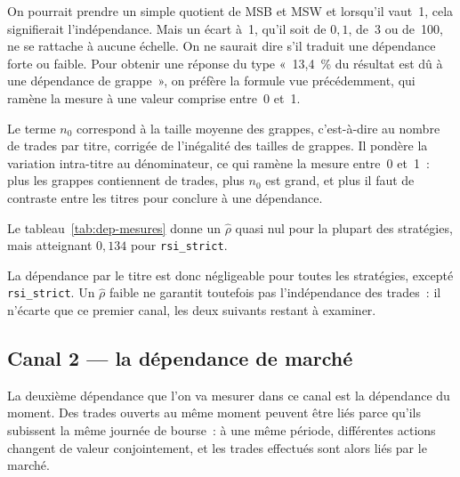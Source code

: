 On pourrait prendre un simple quotient de MSB et MSW et lorsqu'il vaut~1,
cela signifierait l'indépendance. Mais un écart à~1, qu'il soit de
$0{,}1$, de~3 ou de~100, ne se rattache à aucune échelle. On ne saurait
dire s'il traduit une dépendance forte ou faible.
Pour obtenir une réponse du type «~13{,}4~\% du résultat est dû à une
dépendance de grappe~», on préfère la formule vue précédemment, qui ramène
la mesure à une valeur comprise entre~0 et~1.

Le terme $n_0$ correspond à la taille moyenne des grappes, c'est-à-dire au
nombre de trades par titre, corrigée de l'inégalité des tailles de grappes.
Il pondère la variation intra-titre au dénominateur, ce qui ramène la mesure
entre~0 et~1~: plus les grappes contiennent de trades, plus $n_0$ est grand,
et plus il faut de contraste entre les titres pour conclure à une dépendance.

Le tableau~\ref{tab:dep-mesures} donne un $\hat\rho$ quasi nul pour la plupart
des stratégies, mais atteignant $0{,}134$ pour \texttt{rsi\_strict}.

La dépendance par le titre est donc négligeable pour toutes les stratégies,
excepté \texttt{rsi\_strict}. Un $\hat\rho$ faible ne garantit toutefois pas
l'indépendance des trades~: il n'écarte que ce premier canal, les deux suivants
restant à examiner.


\subsection{Canal 2 --- la dépendance de marché}
\label{sec:dep-canal2}


La deuxième dépendance que l'on va mesurer dans ce canal est la dépendance
du moment. Des trades ouverts au même moment peuvent être liés parce qu'ils
subissent la même journée de bourse~: à une même période, différentes actions
changent de valeur conjointement, et les trades effectués sont alors liés par
le marché.

